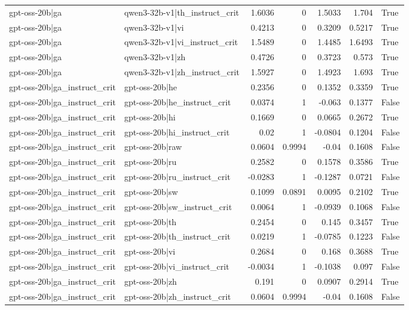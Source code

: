\begin{table}
\begin{tabular}{l l r r r r l}
gpt-oss-20b|ga & qwen3-32b-v1|th_instruct_crit & 1.6036 & 0 & 1.5033 & 1.704 & True \\
gpt-oss-20b|ga & qwen3-32b-v1|vi & 0.4213 & 0 & 0.3209 & 0.5217 & True \\
gpt-oss-20b|ga & qwen3-32b-v1|vi_instruct_crit & 1.5489 & 0 & 1.4485 & 1.6493 & True \\
gpt-oss-20b|ga & qwen3-32b-v1|zh & 0.4726 & 0 & 0.3723 & 0.573 & True \\
gpt-oss-20b|ga & qwen3-32b-v1|zh_instruct_crit & 1.5927 & 0 & 1.4923 & 1.693 & True \\
gpt-oss-20b|ga_instruct_crit & gpt-oss-20b|he & 0.2356 & 0 & 0.1352 & 0.3359 & True \\
gpt-oss-20b|ga_instruct_crit & gpt-oss-20b|he_instruct_crit & 0.0374 & 1 & -0.063 & 0.1377 & False \\
gpt-oss-20b|ga_instruct_crit & gpt-oss-20b|hi & 0.1669 & 0 & 0.0665 & 0.2672 & True \\
gpt-oss-20b|ga_instruct_crit & gpt-oss-20b|hi_instruct_crit & 0.02 & 1 & -0.0804 & 0.1204 & False \\
gpt-oss-20b|ga_instruct_crit & gpt-oss-20b|raw & 0.0604 & 0.9994 & -0.04 & 0.1608 & False \\
gpt-oss-20b|ga_instruct_crit & gpt-oss-20b|ru & 0.2582 & 0 & 0.1578 & 0.3586 & True \\
gpt-oss-20b|ga_instruct_crit & gpt-oss-20b|ru_instruct_crit & -0.0283 & 1 & -0.1287 & 0.0721 & False \\
gpt-oss-20b|ga_instruct_crit & gpt-oss-20b|sw & 0.1099 & 0.0891 & 0.0095 & 0.2102 & True \\
gpt-oss-20b|ga_instruct_crit & gpt-oss-20b|sw_instruct_crit & 0.0064 & 1 & -0.0939 & 0.1068 & False \\
gpt-oss-20b|ga_instruct_crit & gpt-oss-20b|th & 0.2454 & 0 & 0.145 & 0.3457 & True \\
gpt-oss-20b|ga_instruct_crit & gpt-oss-20b|th_instruct_crit & 0.0219 & 1 & -0.0785 & 0.1223 & False \\
gpt-oss-20b|ga_instruct_crit & gpt-oss-20b|vi & 0.2684 & 0 & 0.168 & 0.3688 & True \\
gpt-oss-20b|ga_instruct_crit & gpt-oss-20b|vi_instruct_crit & -0.0034 & 1 & -0.1038 & 0.097 & False \\
gpt-oss-20b|ga_instruct_crit & gpt-oss-20b|zh & 0.191 & 0 & 0.0907 & 0.2914 & True \\
gpt-oss-20b|ga_instruct_crit & gpt-oss-20b|zh_instruct_crit & 0.0604 & 0.9994 & -0.04 & 0.1608 & False \\

\end{tabular}
\end{table}
